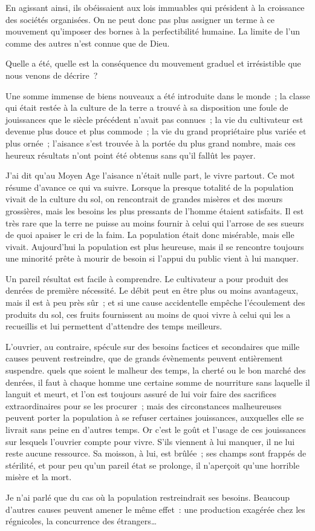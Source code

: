 \documentclass[french,twoside]{book} %
\begin{document}
\noindent En agissant ainsi, ils obéissaient aux lois immuables qui président à la croissance des sociétés organisées. On ne peut donc pas plus assigner un terme à ce mouvement qu’imposer des bornes à la perfectibilité humaine. La limite de l’un comme des autres n’est connue que de Dieu.\par
Quelle a été, quelle est la conséquence du mouvement graduel et irrésistible que nous venons de décrire ?\par
Une somme immense de biens nouveaux a été introduite dans le monde ; la classe qui était restée à la culture de la terre a trouvé à sa disposition une foule de jouissances que le siècle précédent n’avait pas connues ; la vie du cultivateur est devenue plus douce et plus commode ; la vie du grand propriétaire plus variée et plus ornée ; l’aisance s’est trouvée à la portée du plus grand nombre, mais ces heureux résultats n’ont point été obtenus sans qu’il fallût les payer.\par
J'ai dit qu’au Moyen Age l’aisance n’était nulle part, le vivre partout. Ce mot résume d’avance ce qui va suivre. Lorsque la presque totalité de la population vivait de la culture du sol, on rencontrait de grandes misères et des mœurs grossières, mais les besoins les plus pressants de l’homme étaient satisfaits. Il est très rare que la terre ne puisse au moins fournir à celui qui l’arrose de ses sueurs de quoi apaiser le cri de la faim. La population était donc misérable, mais elle vivait. Aujourd’hui la population est plus heureuse, mais il se rencontre toujours une minorité prête à mourir de besoin si l’appui du public vient à lui manquer.\par
Un pareil résultat est facile à comprendre. Le cultivateur a pour produit des denrées de première nécessité. Le débit peut en être plus ou moins avantageux, mais il est à peu près sûr ; et si une cause accidentelle empêche l’écoulement des produits du sol, ces fruits fournissent au moins de quoi vivre à celui qui les a recueillis et lui permettent d’attendre des temps meilleurs.\par
L'ouvrier, au contraire, spécule sur des besoins factices et secondaires que mille causes peuvent restreindre, que de grands évènements peuvent entièrement suspendre. quels que soient le malheur des temps, la cherté ou le bon marché des denrées, il faut à chaque homme une certaine somme de nourriture sans laquelle il languit et meurt, et l’on est toujours assuré de lui voir faire des sacrifices extraordinaires pour se les procurer ; mais des circonstances malheureuses peuvent porter la population à se refuser certaines jouissances, auxquelles elle se livrait sans peine en d’autres temps. Or c’est le goût et l’usage de ces jouissances sur lesquels l’ouvrier compte pour vivre. S'ils viennent à lui manquer, il ne lui reste aucune ressource. Sa moisson, à lui, est brûlée ; ses champs sont frappés de stérilité, et pour peu qu’un pareil état se prolonge, il n’aperçoit qu’une horrible misère et la mort.\par
Je n’ai parlé que du cas où la population restreindrait ses besoins. Beaucoup d’autres causes peuvent amener le même effet : une production exagérée chez les régnicoles, la concurrence des étrangers…\par
\end{document}
